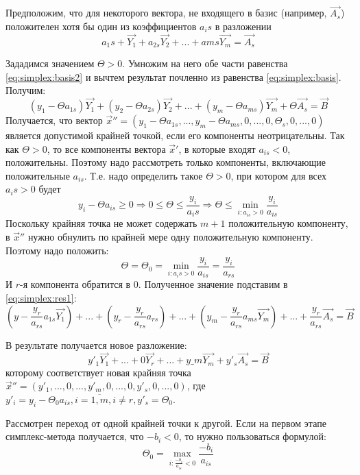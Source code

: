 \documentclass[a4paper, 14pt]{extarticle}
\numberwithin{equation}{section}
\begin{document}
Предположим, что для некоторого вектора, не входящего в базис (например, $\vec{A_s}$) положителен хотя бы один из коэффициентов $a_is$ в разложении
\begin{equation}
    \label{eq:simplex:basis2}
    a_1s + \vec{Y_1} + a_{2s} \vec{Y_2} + ... + a{ms} \vec{Y_m} = \vec{A_s}
\end{equation}

Зададимся значением $\Theta > 0$. Умножим на него обе части равенства \ref{eq:simplex:basis2} и вычтем результат почленно из равенства \ref{eq:simplex:basis}. Получим:
\begin{equation}
    \label{eq:simplex:res1}
    (y_1 - \Theta a_{1s}) \vec{Y_1} + (y_2 - \Theta a_{2s}) \vec{Y_2} + ... + 
    (y_m - \Theta a_{ms}) \vec{Y_m} + \Theta \vec{A_s} = \vec{B}
\end{equation}
Получается, что вектор $ \vec{x}'' = (y_1 - \Theta a_{1s}, ..., y_m - \Theta a_{ms}, 0, ..., 0, \Theta_s, 0, ...,0) $ является допустимой крайней точкой, если его компоненты неотрицательны. Так как $\Theta >0$, то все компоненты вектора $ \vec{x}' $, в которые входят $a_{is} < 0$, положительны. Поэтому надо рассмотреть только компоненты, включающие положительные $a_{is}$. Т.е. надо определить такое $\Theta>0$, при котором для всех $a_is>0$ будет
\[y_i - \Theta a_{is} \ge 0 \Rightarrow 0 \le \Theta \le \frac{y_i}{a_is}
\Rightarrow \Theta \le \min_{i: a_{is} > 0} \frac{y_i}{a_{is}}\]
Поскольку крайняя точка не может содержать $m+1$ положительную компоненту, в $\vec{x}''$ нужно обнулить по крайней мере одну положительную компоненту. Поэтому надо положить:
\[ \Theta = \Theta_0 = \min_{i: a_is > 0} \frac{y_i}{a_{is}} = \frac{y_i}{a_{rs}}  \]
И $r$-я компонента обратится в 0. Полученное значение подставим в \ref{eq:simplex:res1}:
\[ (y - \frac{y_r}{a_{rs}} a_{1s} \vec{Y_1}) + ... + (y_r - \frac{y_r}{a_{rs}} a_{rs}) + ... + (y_m - \frac{y_r}{a_{rs}} a_{ms} \vec{Y_m}) + ... + \frac{y_r}{a_{rs}} \vec{A_s} = \vec{B} \]

В результате получается новое разложение:
\[ y'_1 \vec{Y_1} + ... + 0 \vec{Y_r} + ... + y\_m \vec{Y_m} + y'_s \vec{A_s} = \vec{B} \]
которому соответствует новая крайняя точка $\vec{x}'' = (y'_1, ..., 0, ...,y'_m, 0, ..., 0, y'_s, 0, ..., 0) $, где $y'_i=y_i - \Theta_0 a_{is}, i=\overline{1,m}, i \ne r, y'_s = \Theta_0$.

Рассмотрен переход от одной крайней точки к другой. Если на первом этапе симплекс-метода получается, что $-b_i < 0$, то нужно пользоваться формулой:
\[ \Theta_0 = \max_{i: \frac{-b_i}{a_{is}} < 0} \frac{-b_i}{a_{is}}  \]
\end{document}
